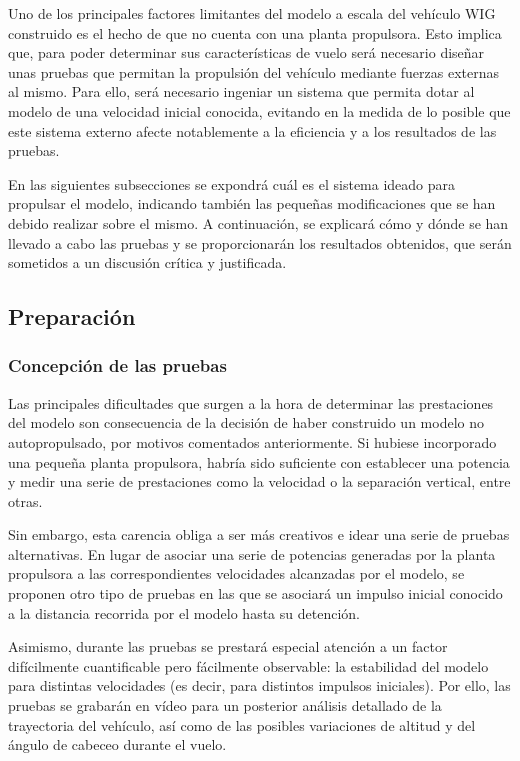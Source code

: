 Uno de los principales factores limitantes del modelo a escala del vehículo WIG construido es el hecho de que no cuenta con una planta propulsora. Esto implica que, para poder determinar sus características de vuelo será necesario diseñar unas pruebas que permitan la propulsión del vehículo mediante fuerzas externas al mismo. Para ello, será necesario ingeniar un sistema que permita dotar al modelo de una velocidad inicial conocida, evitando en la medida de lo posible que este sistema externo afecte notablemente a la eficiencia y a los resultados de las pruebas.

En las siguientes subsecciones se expondrá cuál es el sistema ideado para propulsar el modelo, indicando también las pequeñas modificaciones que se han debido realizar sobre el mismo. A continuación, se explicará cómo y dónde se han llevado a cabo las pruebas y se proporcionarán los resultados obtenidos, que serán sometidos a un discusión crítica y justificada.


\subsection{Preparación}
\label{sec:tests:preparation}

\subsubsection{Concepción de las pruebas}
\label{sec:tests:preparation:conception}

Las principales dificultades que surgen a la hora de determinar las prestaciones del modelo son consecuencia de la decisión de haber construido un modelo no autopropulsado, por motivos comentados anteriormente. Si hubiese incorporado una pequeña planta propulsora, habría sido suficiente con establecer una potencia y medir una serie de prestaciones como la velocidad o la separación vertical, entre otras.

Sin embargo, esta carencia obliga a ser más creativos e idear una serie de pruebas alternativas. En lugar de asociar una serie de potencias generadas por la planta propulsora a las correspondientes velocidades alcanzadas por el modelo, se proponen otro tipo de pruebas en las que se asociará un impulso inicial conocido a la distancia recorrida por el modelo hasta su detención.

Asimismo, durante las pruebas se prestará especial atención a un factor difícilmente cuantificable pero fácilmente observable: la estabilidad del modelo para distintas velocidades (es decir, para distintos impulsos iniciales). Por ello, las pruebas se grabarán en vídeo para un posterior análisis detallado de la trayectoria del vehículo, así como de las posibles variaciones de altitud y del ángulo de cabeceo durante el vuelo.


